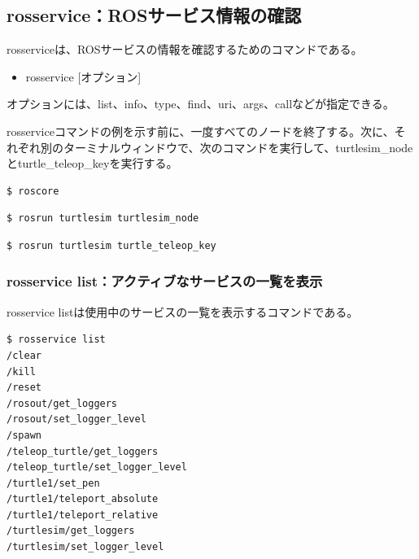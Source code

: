\subsection{rosservice：ROSサービス情報の確認}

rosserviceは、ROSサービスの情報を確認するためのコマンドである。\\

\begin{itemize}
\item rosservice [オプション]\\
\end{itemize}

オプションには、list、info、type、find、uri、args、callなどが指定できる。

rosserviceコマンドの例を示す前に、一度すべてのノードを終了する。次に、それぞれ別のターミナルウィンドウで、次のコマンドを実行して、turtlesim\_nodeとturtle\_teleop\_keyを実行する。

\begin{lstlisting}[language=ROS]
$ roscore
\end{lstlisting}

\begin{lstlisting}[language=ROS]
$ rosrun turtlesim turtlesim_node
\end{lstlisting}

\begin{lstlisting}[language=ROS]
$ rosrun turtlesim turtle_teleop_key
\end{lstlisting}

\subsubsection{rosservice list：アクティブなサービスの一覧を表示}

rosservice listは使用中のサービスの一覧を表示するコマンドである。

\begin{lstlisting}[language=ROS]
$ rosservice list
/clear
/kill
/reset
/rosout/get_loggers
/rosout/set_logger_level
/spawn
/teleop_turtle/get_loggers
/teleop_turtle/set_logger_level
/turtle1/set_pen
/turtle1/teleport_absolute
/turtle1/teleport_relative
/turtlesim/get_loggers
/turtlesim/set_logger_level
\end{lstlisting}


